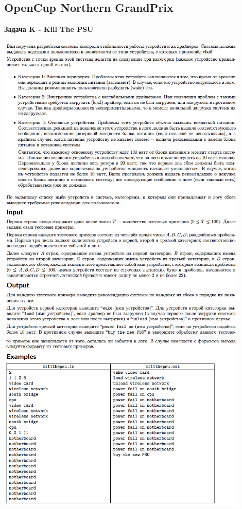 \documentclass[a4paper,12pt]{article}
\begin{document}
\subsection{OpenCup Northern GrandPrix}

\textbf{{\large Задача K - Kill The PSU}} \\
\begin{center}
\includegraphics[width=0.9\textwidth]{OC_Northern/OC_Northern_K1.png}\\ [1cm]
\includegraphics[width=0.9\textwidth]{OC_Northern/OC_Northern_K2.png}\\ [1cm]
\end{center}
\newpage
\end{document}
